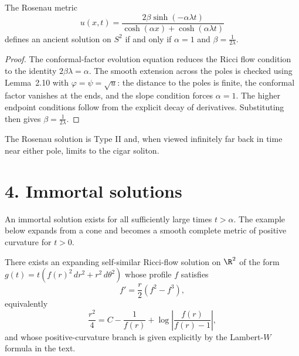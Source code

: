 \begin{lemma}
\label{ch02-lem-rosenau-sphere}
The Rosenau metric
\[
u(x,t)=\frac{2\beta\sinh(-\alpha\lambda t)}{\cosh(\alpha x)+\cosh(\alpha\lambda t)}
\]
defines an ancient solution on \(S^2\) if and only if \(\alpha=1\) and
\(\beta=\frac{1}{2\lambda}\).
\end{lemma}

\begin{proof}
\sketch The conformal-factor evolution equation reduces the Ricci flow condition to the
identity \(2\beta\lambda=\alpha\). The smooth extension across the poles is
checked using Lemma~2.10 with \(\varphi=\psi=\sqrt{u}\): the distance to the
poles is finite, the conformal factor vanishes at the ends, and the slope
condition forces \(\alpha=1\). The higher endpoint conditions follow from the
explicit decay of derivatives. Substituting then gives \(\beta=\frac1{2\lambda}\).
\end{proof}

\begin{remark}
\label{ch02-rem-rosenau-limit-cigar}
The Rosenau solution is Type II and, when viewed infinitely far back in time
near either pole, limits to the cigar soliton.
\end{remark}

\section*{4. Immortal solutions}

An immortal solution exists for all sufficiently large times \(t>\alpha\). The
example below expands from a cone and becomes a smooth complete metric of
positive curvature for \(t>0\).

\begin{lemma}
\label{ch02-lem-expanding-cone-soliton}
There exists an expanding self-similar Ricci-flow solution on \(\R^2\) of the
form \(g(t)=t(f(r)^2\,dr^2+r^2\,d\theta^2)\) whose profile \(f\) satisfies
\[
f'=\frac r2(f^2-f^3),
\]
equivalently
\[
\frac{r^2}{4}=C-\frac1{f(r)}+\log\left|\frac{f(r)}{f(r)-1}\right|,
\]
and whose positive-curvature branch is given explicitly by the Lambert-\(W\)
formula in the text.
\end{lemma}

